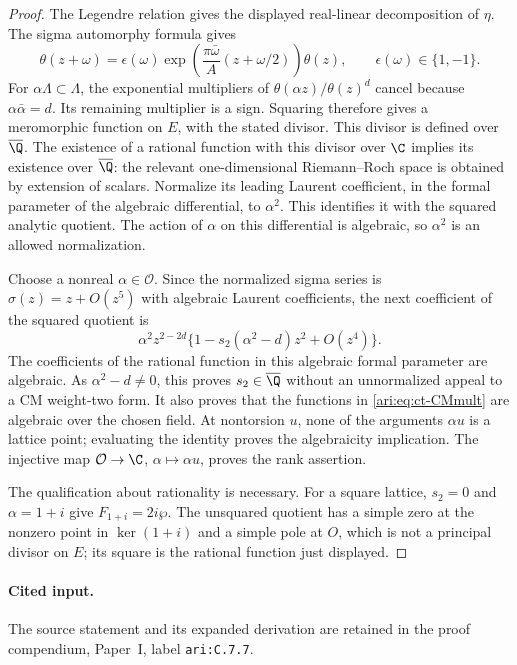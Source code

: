 \begin{proof}
The Legendre relation gives the displayed real-linear decomposition
of $\eta$. The sigma automorphy formula gives
\[
 \theta(z+\omega)=\epsilon(\omega)
  \exp\left(\frac{\pi\bar\omega}{A}
                         (z+\omega/2)\right)\theta(z),
 \qquad \epsilon(\omega)\in\{1,-1\}.
\]
For $\alpha\Lambda\subset\Lambda$, the exponential multipliers
of $\theta(\alpha z)/\theta(z)^d$ cancel because
$\alpha\bar\alpha=d$. Its remaining multiplier is a sign.
Squaring therefore gives a meromorphic function on $E$, with the
stated divisor. This divisor is defined over $\overline{\Q}$.
The existence of a rational function with this divisor over $\C$
implies its existence over $\overline{\Q}$: the relevant
one-dimensional Riemann--Roch space is obtained by extension of
scalars. Normalize its leading Laurent coefficient, in the formal
parameter of the algebraic differential, to $\alpha^2$. This
identifies it with the squared analytic quotient. The action of
$\alpha$ on this differential is algebraic, so $\alpha^2$ is an
allowed normalization.

Choose a nonreal $\alpha\in\mathcal O$. Since the normalized
sigma series is $\sigma(z)=z+O(z^5)$ with algebraic Laurent
coefficients, the next coefficient of the squared quotient is
\[
 \alpha^2z^{2-2d}
       \{1-s_2(\alpha^2-d)z^2+O(z^4)\}.
\]
The coefficients of the rational function in this algebraic formal
parameter are algebraic. As $\alpha^2-d\ne0$, this proves
$s_2\in\overline{\Q}$ without an unnormalized appeal to a CM
weight-two form. It also proves that the functions in
\eqref{ari:eq:ct-CMmult} are algebraic over the chosen field.
At nontorsion $u$, none of the arguments $\alpha u$ is a lattice
point; evaluating the identity proves the algebraicity implication.
The injective map $\mathcal O\to\C$, $\alpha\mapsto\alpha u$,
proves the rank assertion.

The qualification about rationality is necessary. For a square
lattice, $s_2=0$ and $\alpha=1+i$ give
$F_{1+i}=2i\wp$. The unsquared quotient has a simple zero at
the nonzero point in $\ker(1+i)$ and a simple pole at $O$,
which is not a principal divisor on $E$; its square is the
rational function just displayed.
\end{proof}


\paragraph{Cited input.} \label{ari:C.7.7}The source statement and its expanded derivation are retained in the proof compendium, Paper~I, label \nolinkurl{ari:C.7.7}.\par

